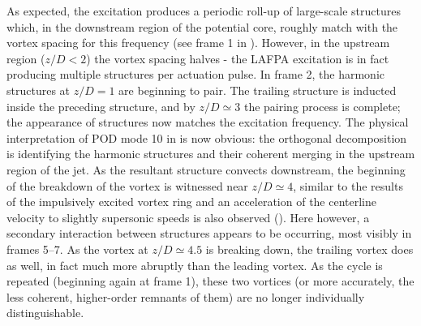 As expected, the excitation produces a periodic roll-up of large-scale structures which, in the downstream region of the potential core, roughly match with the vortex spacing for this frequency (see frame 1 in ).
However, in the upstream region ($z/D < 2$) the vortex spacing halves - the LAFPA excitation is in fact producing multiple structures per actuation pulse.
In frame 2, the harmonic structures at $z/D = 1$ are beginning to pair.
The trailing structure is inducted inside the preceding structure, and by $z/D \simeq 3$ the pairing process is complete; the appearance of structures now matches the excitation frequency.
The physical interpretation of POD mode 10 in  is now obvious: the orthogonal decomposition is identifying the harmonic structures and their coherent merging in the upstream region of the jet.
As the resultant structure convects downstream, the beginning of the breakdown of the vortex is witnessed near $z/D \simeq 4$, similar to the results of the impulsively excited vortex ring and an acceleration of the centerline velocity to slightly supersonic speeds is also observed ().
Here however, a secondary interaction between structures appears to be occurring, most visibly in frames 5--7. 
As the vortex at $z/D \simeq 4.5$ is breaking down, the trailing vortex does as well, in fact much more abruptly than the leading vortex.
As the cycle is repeated (beginning again at frame 1), these two vortices (or more accurately, the less coherent, higher-order remnants of them) are no longer individually distinguishable.

